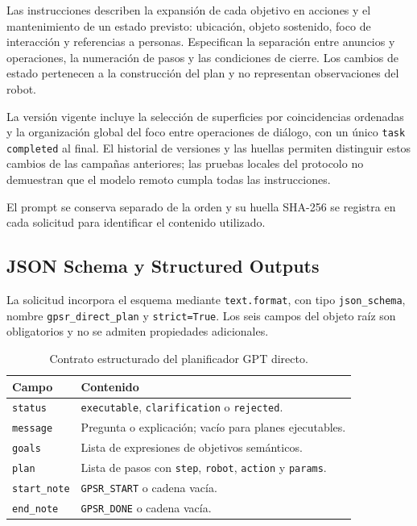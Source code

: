 Las instrucciones describen la expansión de cada objetivo en acciones
y el mantenimiento de un estado previsto: ubicación, objeto sostenido,
foco de interacción y referencias a personas. Especifican la separación
entre anuncios y operaciones, la numeración de pasos y las condiciones
de cierre. Los cambios de estado pertenecen a la construcción del plan
y no representan observaciones del robot.

La versión vigente incluye la selección de superficies por coincidencias
ordenadas y la organización global del foco entre operaciones de diálogo,
con un único \texttt{task completed} al final. El historial de versiones
y las huellas permiten distinguir estos cambios de las campañas anteriores;
las pruebas locales del protocolo no demuestran que el modelo remoto
cumpla todas las instrucciones.

El prompt se conserva separado de la orden y su huella SHA-256 se
registra en cada solicitud para identificar el contenido utilizado.

\subsection{JSON Schema y Structured Outputs}

La solicitud incorpora el esquema mediante \texttt{text.format},
con tipo \texttt{json\_schema}, nombre \texttt{gpsr\_\allowbreak direct\_\allowbreak plan}
y \texttt{strict=True}. Los seis campos del objeto raíz son
obligatorios y no se admiten propiedades adicionales.

\begin{table}[htbp]
\centering
\caption{Contrato estructurado del planificador GPT directo.}
\label{tab:contrato_gpt_impl}
\begin{tabular}{|p{}|p{}|}
\hline
\textbf{Campo} & \textbf{Contenido} \\
\hline
\texttt{status} & \texttt{executable}, \texttt{clarification} o \texttt{rejected}. \\
\texttt{message} & Pregunta o explicación; vacío para planes ejecutables. \\
\texttt{goals} & Lista de expresiones de objetivos semánticos. \\
\texttt{plan} & Lista de pasos con \texttt{step}, \texttt{robot}, \texttt{action} y \texttt{params}. \\
\texttt{start\_note} & \texttt{GPSR\_START} o cadena vacía. \\
\texttt{end\_note} & \texttt{GPSR\_DONE} o cadena vacía. \\
\hline
\end{tabular}
\end{table}

